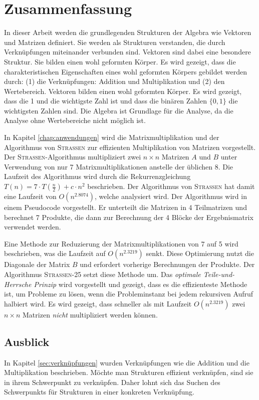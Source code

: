 \documentclass{report}
\numberwithin{equation}{section}
\begin{document}
\chapter{Zusammenfassung}
In dieser Arbeit werden die grundlegenden Strukturen der Algebra wie Vektoren und Matrizen definiert. Sie werden als Strukturen verstanden, die durch Verknüpfungen miteinander verbunden sind. Vektoren sind dabei eine besondere Struktur. Sie bilden einen wohl geformten Körper. Es wird gezeigt, dass die charakteristischen Eigenschaften eines wohl geformten Körpers gebildet werden durch: (1) die Verknüpfungen: Addition und Multiplikation und (2) den Wertebereich. Vektoren bilden einen wohl geformten Körper. Es wird gezeigt, dass die 1 und die wichtigste Zahl ist und dass die binären Zahlen $\{0, 1\}$ die wichtigsten Zahlen sind. Die Algebra ist Grundlage für die Analyse, da die Analyse ohne Wertebereiche nicht möglich ist.

In Kapitel \ref{chap:anwendungen} wird die Matrixmultiplikation und der Algorithmus von \textsc{Strassen} zur effizienten Multiplikation von Matrizen vorgestellt. Der \textsc{Strassen}-Algorithmus multipliziert zwei $n \times n$ Matrizen $A$ und $B$ unter Verwendung von nur 7 Matrixmultiplikationen anstelle der üblichen 8. Die Laufzeit des Algorithmus wird durch die Rekurrenzgleichung $T(n) = 7 \cdot T\left(\frac{n}{2}\right) + c \cdot n^2$ beschrieben. Der Algorithmus von \textsc{Strassen} hat damit eine Laufzeit von $O(n^{2.8074})$, welche analysiert wird. Der Algorithmus wird in einem Pseudocode vorgestellt. Er unterteilt die Matrizen in 4 Teilmatrizen und berechnet 7 Produkte, die dann zur Berechnung der 4 Blöcke der Ergebnismatrix verwendet werden.

Eine Methode zur Reduzierung der Matrixmultiplikationen von 7 auf 5 wird beschrieben, was die Laufzeit auf $O(n^{2.3219})$ senkt. Diese Optimierung nutzt die Diagonale der Matrix $B$ und erfordert vorherige Berechnungen der Produkte. Der Algorithmus \textsc{Strassen-25} setzt diese Methode um. Das \textit{optimale Teile-und-Herrsche Prinzip} wird vorgestellt und gezeigt, dass es die effizienteste Methode ist, um Probleme zu lösen, wenn die Probleminstanz bei jedem rekursiven Aufruf halbiert wird. Es wird gezeigt, dass schneller als mit Laufzeit $O(n^{2.3219})$ zwei $n \times n$ Matrizen \textit{nicht} multipliziert werden können.

\section{Ausblick}
In Kapitel \ref{sec:verknüpfungen} wurden Verknüpfungen wie die Addition und die Multiplikation beschrieben. Möchte man Strukturen effizient verknüpfen, sind sie in ihrem Schwerpunkt zu verknüpfen. Daher lohnt sich das Suchen des Schwerpunkts für Strukturen in einer konkreten Verknüpfung.
\end{document}
